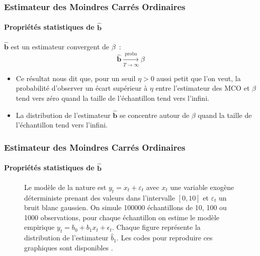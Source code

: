 \documentclass[10pt]{beamer}
\begin{document}
\begin{frame}
  \frametitle{Estimateur des Moindres Carrés Ordinaires}
  \framesubtitle {Propriétés statistiques de $\hat{\mathbf b}$}


  \begin{prop}\label{prop:mco:convergence}
    $\hat{\mathbf b}$ est un estimateur convergent de $\beta$~:
    \[
      \hat{\mathbf b} \underset{T\to\infty}{\overset{\text{proba}}{\longrightarrow}} \beta
    \]
  \end{prop}

  \bigskip\bigskip

  \begin{itemize}

  \item Ce résultat nous dit que, pour un seuil $\eta>0$ aussi petit que l'on veut, la probabilité d'observer un écart supérieur à $\eta$ entre l'estimateur des MCO et $\beta$ tend vers zéro quand la taille de l'échantillon tend vers l'infini.\newline

  \item La distribution de l'estimateur $\hat{\mathbf b}$ se concentre autour de $\beta$ quand la taille de l'échantillon tend vers l'infini.

  \end{itemize}

\end{frame}

\clearpage

\begin{frame}
  \frametitle{Estimateur des Moindres Carrés Ordinaires}
  \framesubtitle {Propriétés statistiques de $\hat{\mathbf b}$}

  \begin{figure}
    \centering
      \scalebox{.40}{
    }
  \caption{Le modèle de la nature est $y_t = x_t + \varepsilon_t$ avec $x_t$ une variable exogène déterministe prenant des valeurs dans l'intervalle $[0,10]$ et $\varepsilon_t$ un bruit blanc gaussien. On simule 100000  échantillons de 10, 100 ou 1000 observations, pour chaque échantillon on estime le modèle empirique $y_t = b_0 + b_1 x_t + \epsilon_t$. Chaque figure représente la distribution de l'estimateur $\hat b_1$. Les codes pour reproduire ces graphiques sont disponibles .}
\end{figure}
\end{frame}
\end{document}
